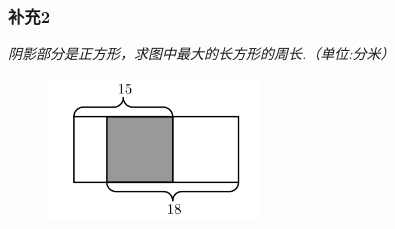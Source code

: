 \begin{frame}
    \frametitle{补充2}
    \textit{阴影部分是正方形，求图中最大的长方形的周长.（单位:分米）}
    \begin{figure}[H] 
        \centering
        \includegraphics[width=0.5\textwidth]{./pics/Chapter_1/buchong2.png}
    \end{figure}
\end{frame}